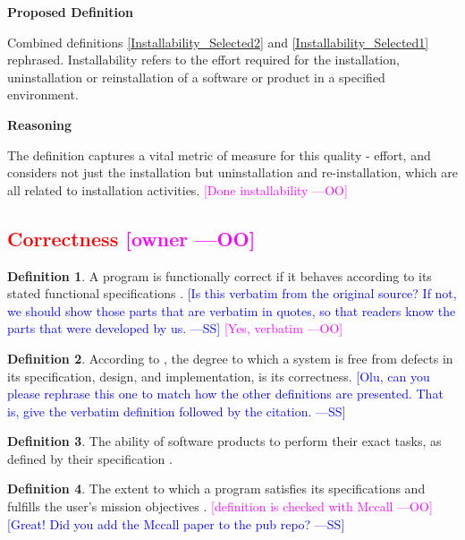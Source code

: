 \documentclass[letterpaper,cleveref]{lipics-v2019}
\newcommand{\authornote}[3]{\textcolor{#1}{[#3 ---#2]}}
\newcommand{\authornote}[3]{}
\newcommand{\wss}[1]{\authornote{blue}{SS}{#1}} %
\newcommand{\oo}[1]{\authornote{magenta}{OO}{#1}} %
\newcommand{\notdone}[1]{\textcolor{red}{#1}}
\theoremstyle{definition}
\newtheorem{defn}{Definition}
\begin{document}
\noindent \textbf{Proposed Definition}

Combined definitions \ref{Installability_Selected2} and
\ref{Installability_Selected1} rephrased.  Installability refers to the
effort required for the installation, uninstallation or reinstallation of a
software or product in a specified environment.

\noindent \textbf{Reasoning}

The definition captures a vital metric of measure for this quality - effort, and
considers not just the installation but uninstallation and re-installation, which
are all related to installation activities.  \oo{Done installability}

\subsection{\notdone{Correctness} \oo{owner}}

\begin{defn}  
  A program is functionally correct if it behaves according to its stated
  functional specifications \citep{GhezziEtAl2003}.  \wss{Is this verbatim from
    the original source?  If not, we should show those parts that are verbatim
    in quotes, so that readers know the parts that were developed by us.}
  \oo{Yes, verbatim}
	
\end{defn}

\begin{defn}
  According to \citet{wilson2009quality}, the degree to which a system is free
  from defects in its specification, design, and implementation, is its
  correctness.  \wss{Olu, can you please rephrase this one to match how the
    other definitions are presented.  That is, give the verbatim definition
    followed by the citation.}
\end{defn}

\begin{defn}
  The ability of software products to perform their exact tasks, as defined by
  their specification \citep{meyer1988object}.
\end{defn}

\begin{defn} 
  The extent to which a program satisfies its specifications and fulfills the
  user's mission objectives \citep{McCallEtAl1977}. \oo{definition is checked
    with Mccall} \wss{Great!  Did you add the Mccall paper to the pub repo?}
\end{defn}
\end{document}
